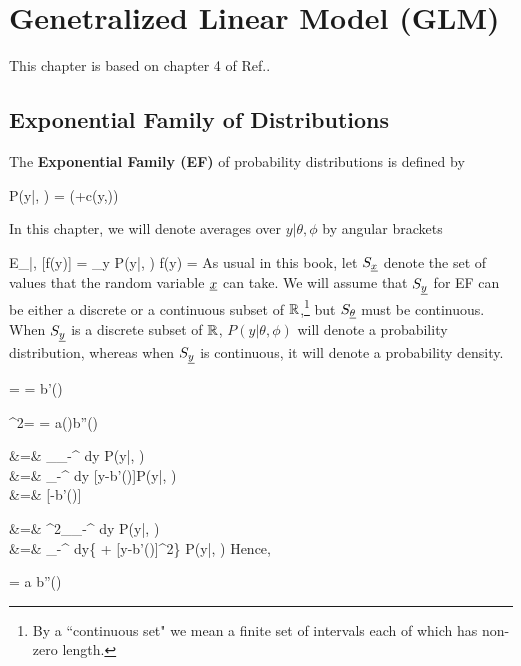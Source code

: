 \chapter{Genetralized Linear Model (GLM)}
\label{ch-gen-lin-mod}

This chapter is based on
chapter 4 of Ref.\cite{agresti-book}.

\section{Exponential Family of Distributions}
\label{sec-exp-fam}

The {\bf Exponential Family (EF)} of probability distributions is defined by

\beq
P(y|\theta, \phi) =
\exp\left(+c(y,\phi)\right)
\eeq

In this chapter, we will
denote averages over $y|\theta, \phi$ by angular brackets

\beq
E_{\rvy|\theta, \phi}[f(y)] = \sum_y P(y|\theta, \phi) f(y) = 
\eeq
As usual in this book, let $S_{\underline{x}}$ denote the set of
values that the random variable ${\underline{x}}$ can take.
We will assume that $S_{\underline{y}}$
for EF
can be either a discrete or a continuous
subset of ${ \mathbb{R}}$,\footnote{By a ``continuous set" we
mean a finite set of intervals
 each of which has non-zero length.}
but $S_{\underline{\theta}}$
must be continuous.
When $S_{\underline{y}}$ is a discrete subset of ${ \mathbb{R}}$, $P(y|\theta, \phi)$
will denote a probability distribution, whereas when
$S_{\underline{y}}$ is continuous, it will denote
a probability density.

\begin{claim}
\beq
\mu = \av{\rvy} = b'(\theta)
\eeq

\beq
\s^2= \av{\rvy, \rvy} = a(\phi)b''(\theta)
\eeq
\end{claim}
\proof

&=& \partial_\theta \int_{-\infty}^\infty
dy\; P(y|\theta, \phi)
\\
&=&
\int_{-\infty}^\infty
dy\;
[y-b'(\theta)]P(y|\theta, \phi)
\\
&=&
[\av{\rvy}-b'(\theta)]
\eeqa

&=& \partial^2_\theta \int_{-\infty}^\infty
dy\; P(y|\theta, \phi)
\\
&=&
\int_{-\infty}^\infty
dy\;\left\{ +
[y-b'(\theta)]^2\right\}
P(y|\theta, \phi)
\eeqa
Hence,

\beq
{}= a b''(\theta)
\eeq

